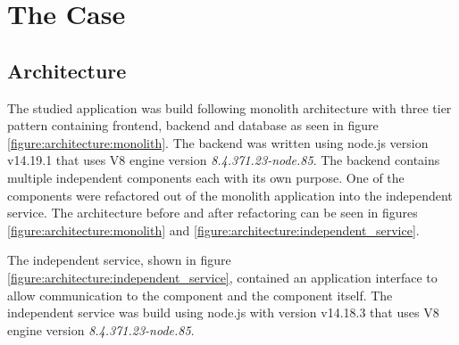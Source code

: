 \chapter{The Case\label{case}}

\section{Architecture}
The studied application was build following monolith architecture with three tier pattern containing frontend, backend and database as seen in figure \ref{figure:architecture:monolith}.
The backend was written using node.js version v14.19.1 that uses V8 engine version \textit{8.4.371.23-node.85}.
The backend contains multiple independent components each with its own purpose.
One of the components were refactored out of the monolith application into the independent service.
The architecture before and after refactoring can be seen in figures \ref{figure:architecture:monolith} and \ref{figure:architecture:independent_service}.

The independent service, shown in figure \ref{figure:architecture:independent_service}, contained an application interface to allow communication to the component and the component itself.
The independent service was build using node.js with version v14.18.3 that uses V8 engine version \textit{8.4.371.23-node.85}.

